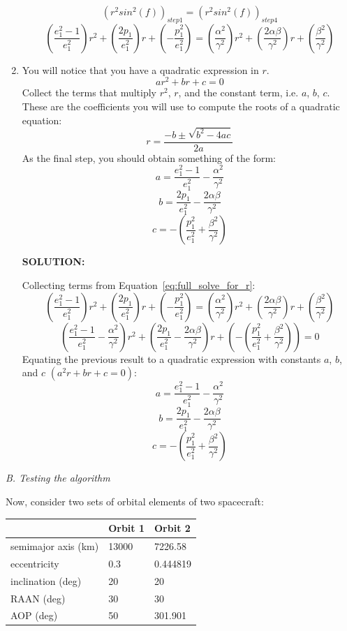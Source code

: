 \documentclass[12pt, letterpaper]{aiaa-tc}
\begin{document}
\begin{enumerate}
    \[ \left(r^2sin^2(f)\right)_{step 1}=\left(r^2sin^2(f)\right)_{step 4} \]
    \begin{equation}
        \left(\frac{e_1^2-1}{e_1^2}\right)r^2+\left(\frac{2p_1}{e_1^2}\right)r+\left(-\frac{p_1^2}{e_1^2}\right)=\left(\frac{\alpha^2}{\gamma^2}\right)r^2+\left(\frac{2\alpha\beta}{\gamma^2}\right)r+\left(\frac{\beta^2}{\gamma^2}\right)
        \label{eq:full_solve_for_r}
    \end{equation}
    \item You will notice that you have a quadratic expression in $r$.
    \[ ar^2+br+c=0 \]
    Collect the terms that multiply $r^2$, $r$, and the constant term, i.e. $a$, $b$, $c$. These are the coefficients you will
    use to compute the roots of a quadratic equation:
    \[ r=\frac{-b\pm\sqrt{b^2-4ac}}{2a} \]
    As the final step, you should obtain something of the form:
    \[ a=\frac{e_1^2-1}{e_1^2}-\frac{\alpha^2}{\gamma^2} \]
    \[ b=\frac{2p_1}{e_1^2}-\frac{2\alpha\beta}{\gamma^2} \]
    \[ c=-\left(\frac{p_1^2}{e_1^2}+\frac{\beta^2}{\gamma^2}\right) \]

    \textbf{SOLUTION:}

    Collecting terms from Equation~\eqref{eq:full_solve_for_r}:
    \[ \left(\frac{e_1^2-1}{e_1^2}\right)r^2+\left(\frac{2p_1}{e_1^2}\right)r+\left(-\frac{p_1^2}{e_1^2}\right)=\left(\frac{\alpha^2}{\gamma^2}\right)r^2+\left(\frac{2\alpha\beta}{\gamma^2}\right)r+\left(\frac{\beta^2}{\gamma^2}\right) \]
    \[ \left(\frac{e_1^2-1}{e_1^2}-\frac{\alpha^2}{\gamma^2}\right)r^2+\left(\frac{2p_1}{e_1^2}-\frac{2\alpha\beta}{\gamma^2}\right)r+\left(-\left(\frac{p_1^2}{e_1^2}+\frac{\beta^2}{\gamma^2}\right)\right)=0 \]
    Equating the previous result to a quadratic expression with constants $a$, $b$, and $c$ $\left(a^2r+br+c=0\right)$:
    \[ a=\frac{e_1^2-1}{e_1^2}-\frac{\alpha^2}{\gamma^2} \]
    \[ b=\frac{2p_1}{e_1^2}-\frac{2\alpha\beta}{\gamma^2} \]
    \[ c=-\left(\frac{p_1^2}{e_1^2}+\frac{\beta^2}{\gamma^2}\right) \]
\end{enumerate}

\raggedright \textit{B. Testing the algorithm}

Now, consider two sets of orbital elements of two spacecraft:


\begin{table}[h]
    \centering
    \begin{tabular}{|l|l|l|}
    \hline
                        & Orbit 1 & Orbit 2  \\ \hline
    semimajor axis (km) & 13000   & 7226.58  \\
    eccentricity        & 0.3     & 0.444819 \\
    inclination (deg)   & 20      & 20       \\
    RAAN (deg)          & 30      & 30       \\
    AOP (deg)           & 50      & 301.901  \\ \hline
    \end{tabular}
\end{table}
\end{document}
